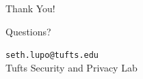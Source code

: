 \documentclass{beamer}
\begin{document}
\begin{frame}
\begin{center}
\Huge Thank You!

\vspace{1cm}

\Large Questions?

\vspace{1cm}

\normalsize
\texttt{seth.lupo@tufts.edu}\\
\vspace{0.5cm}
Tufts Security and Privacy Lab

\end{center}
\end{frame}
\end{document}
